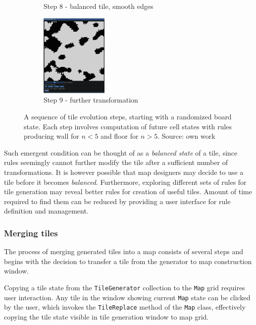 \documentclass[12pt]{report}
\begin{document}
\begin{figure}[H]
\begin{subfigure}[t]{0.3\textwidth}
		\caption{Step 8 - balanced tile, smooth edges} 
	\end{subfigure} \hspace{1em} 
	\begin{subfigure}[t]{0.3\textwidth}
		\centering
		\includegraphics[height=4cm]{images/s_9}
		\caption{Step 9 - further transformation} 
	\end{subfigure} \hspace{1em} 
	\label{fig:gensteps}
	\caption{A sequence of tile evolution steps, starting with a randomized board state. Each step involves computation of future cell states with rules producing wall for $n < 5$ and floor for $n > 5$. Source: own work} 
\end{figure}

Such emergent condition can be thought of as a \textit{balanced state} of a tile, since rules seemingly cannot further modify the tile after a sufficient number of transformations. It is however possible that map designers may decide to use a tile before it becomes \textit{balanced}. Furthermore, exploring different sets of rules for tile generation may reveal better rules for creation of useful tiles. Amount of time required to find them can be reduced by providing a user interface for rule definition and management.

\subsubsection{Merging tiles}
 
The process of merging generated tiles into a map consists of several steps and begins with the decision to transfer a tile from the generator to map construction window.

Copying a tile state from the \texttt{TileGenerator} collection to the \texttt{Map} grid requires user interaction. Any tile in the window showing current \texttt{Map} state can be clicked by the user, which invokes the \texttt{TileReplace} method of the \texttt{Map} class, effectively copying the tile state visible in tile generation window to map grid. 
\end{document}
